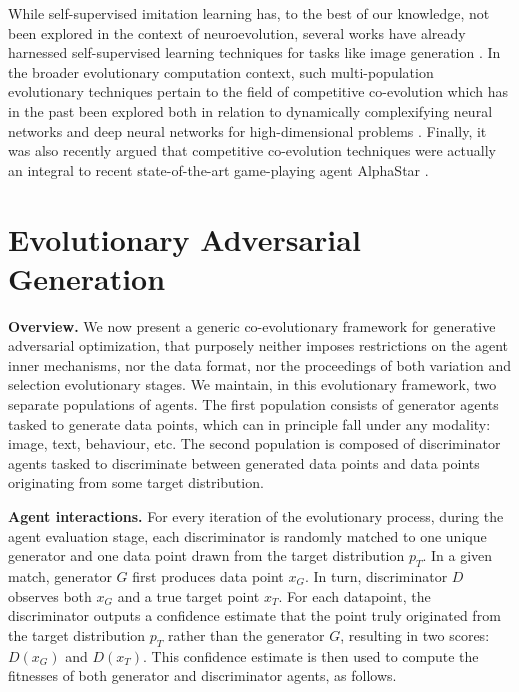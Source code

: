\documentclass[dvipsnames,format=sigconf,anonymous=false,review=false]{acmart}
\begin{document}
While self-supervised imitation learning has, to the best of our knowledge, not been explored in the context of neuroevolution, several works have already harnessed self-supervised learning techniques for tasks like image generation \cite{costa2020neuroevolution}. In the broader evolutionary computation context, such multi-population evolutionary techniques pertain to the field of competitive co-evolution which has in the past been explored both in relation to dynamically complexifying neural networks \cite{stanley2004competitive} and deep neural networks for high-dimensional problems \cite{klijn2021coevolutionary}. Finally, it was also recently argued \cite{arulkumaran2019alphastar} that competitive co-evolution techniques were actually an integral to recent state-of-the-art game-playing agent AlphaStar \cite{vinyals2019grandmaster}.

\vspace{-1em}
\section{Evolutionary Adversarial Generation}


\textbf{Overview.} We now present a generic co-evolutionary framework for generative adversarial optimization, that purposely neither imposes restrictions on the agent inner mechanisms, nor the data format, nor the proceedings of both variation and selection evolutionary stages. We maintain, in this evolutionary framework, two separate populations of agents. The first population consists of generator agents tasked to generate data points, which can in principle fall under any modality: image, text, behaviour, etc. The second population is composed of discriminator agents tasked to discriminate between generated data points and data points originating from some target distribution.

\textbf{Agent interactions.} For every iteration of the evolutionary process, during the agent evaluation stage, each discriminator is randomly matched to one unique generator and one data point drawn from the target distribution $p_T$. In a given match, generator $G$ first produces data point $x_G$. In turn, discriminator $D$ observes both $x_G$ and a true target point $x_T$. For each datapoint, the discriminator outputs a confidence estimate that the point truly originated from the target distribution $p_T$ rather than the generator $G$, resulting in two scores: $D(x_G)$ and $D(x_T)$. This confidence estimate is then used to compute the fitnesses of both generator and discriminator agents, as follows.
\end{document}
